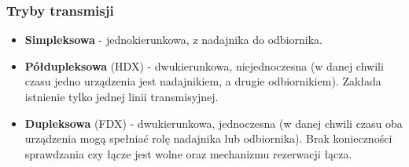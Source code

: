 \documentclass[a4paper,twoside]{article}
\begin{document}
		\subsubsection{Tryby transmisji}
		\begin{itemize}
			\item \textbf{Simpleksowa} - jednokierunkowa, z nadajnika do odbiornika.
			\item \textbf{Półdupleksowa} (HDX) - dwukierunkowa, niejednoczesna (w danej chwili czasu jedno urządzenia jest nadajnikiem, a drugie odbiornikiem). Zakłada istnienie tylko jednej linii transmisyjnej.
			\item \textbf{Dupleksowa} (FDX) - dwukierunkowa, jednoczesna (w danej chwili czasu oba urządzenia mogą spełniać rolę nadajnika lub odbiornika). Brak konieczności sprawdzania czy łącze jest wolne oraz mechanizmu rezerwacji łącza.
		\end{itemize}
\end{document}
